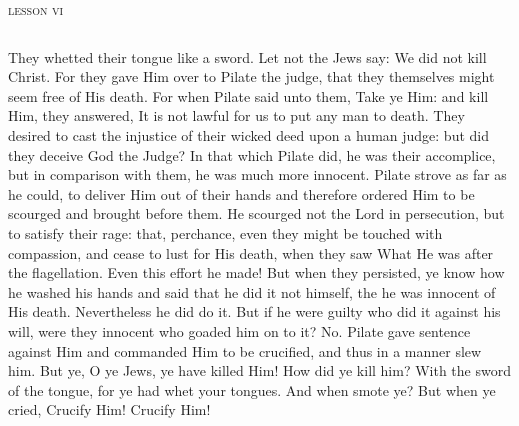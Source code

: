 \pagebreak
\begin{center}{\textsc{lesson vi}}\end{center}
\begin{columns}
{They whetted their tongue like a sword. Let not the Jews say: We did not kill Christ. For they gave Him over to Pilate the judge, that they themselves might seem free of His death. For when Pilate said unto them, Take ye Him: and kill Him, they answered, It is not lawful for us to put any man to death. They desired to cast the injustice of their wicked deed upon a human judge: but did they deceive God the Judge? In that which Pilate did, he was their accomplice, but in comparison with them, he was much more innocent. Pilate strove as far as he could, to deliver Him out of their hands and therefore ordered Him to be scourged and brought before them. He scourged not the Lord in persecution, but to satisfy their rage: that, perchance, even they might be touched with compassion, and cease to lust for His death, when they saw What He was after the flagellation. Even this effort he made! But when they persisted, ye know how he washed his hands and said that he did it not himself, the he was innocent of His death. Nevertheless he did do it. But if he were guilty who did it against his will, were they innocent who goaded him on to it? No. Pilate gave sentence against Him and commanded Him to be crucified, and thus in a manner slew him. But ye, O ye Jews, ye have killed Him! How did ye kill him? With the sword of the tongue, for ye had whet your tongues. And when smote ye? But when ye cried, Crucify Him! Crucify Him!}
\end{columns}


